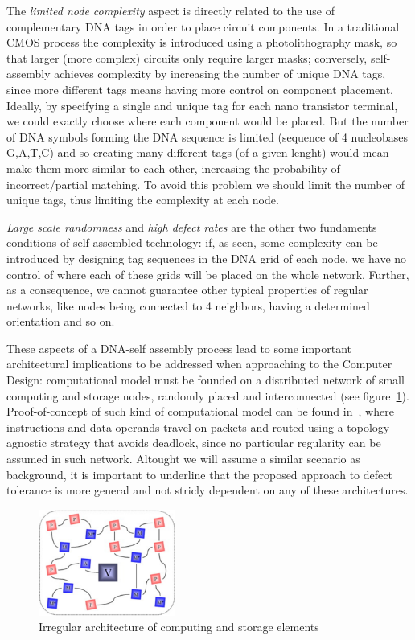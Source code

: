 The \emph{limited node complexity} aspect is directly
related to the use of complementary DNA tags in order to place circuit
components. In a traditional CMOS process the complexity is introduced
using a photolithography mask, so that larger (more complex) circuits
only require larger masks; conversely, self-assembly achieves
complexity by increasing the number of unique DNA tags, since more
different tags means having more control on component placement. Ideally, by specifying a single
and unique tag for each nano transistor terminal, we could exactly
choose where each component would be placed. But the number of DNA
symbols forming the DNA sequence is limited (sequence of 4 nucleobases
G,A,T,C) and so creating many different tags (of a given lenght) would
mean make them more similar to each other, increasing the probability
of incorrect/partial matching. To avoid this problem we should limit
the number of unique tags, thus limiting the complexity at each node. 

\emph{Large scale randomness} and \emph{high defect rates} are the other two fundaments
conditions of self-assembled technology: if, as seen, some complexity
can be introduced by designing tag sequences in the DNA grid of each
node, we have no control of where each of these grids will be placed
on the whole network. Further, as a consequence, we cannot guarantee
other typical properties of regular networks, like nodes being
connected to 4 neighbors, having a determined orientation and so on.

These aspects of a DNA-self assembly process lead to some important
architectural implications to be addressed when approaching to the
Computer Design: computational model must be founded on a distributed
network of small computing and storage nodes, randomly placed and
interconnected (see figure~\ref{fig:nana}).  Proof-of-concept of such kind of computational model
can be found in~\cite{}, where instructions and data operands travel
on packets and routed using a topology-agnostic strategy that avoids
deadlock, since no particular regularity can be assumed in such
network. Altought we will assume a similar scenario as background, it
is important to underline that the proposed approach to defect
tolerance is more general and not stricly dependent on any of these
architectures.
\begin{figure}
  \centering
    \includegraphics[width=0.40\textwidth]{pictures/nana.ps}
  \caption{Irregular architecture of computing and storage elements}
  \label{fig:nana}
\end{figure}

